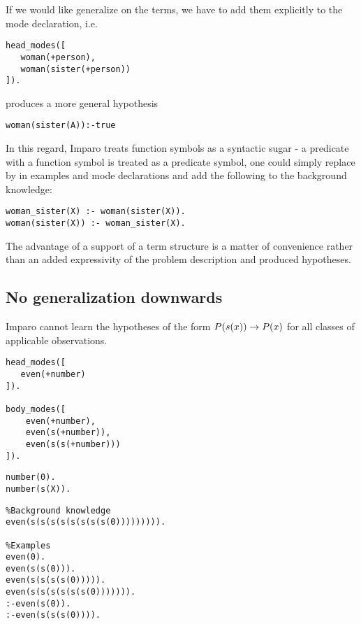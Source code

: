 If we would like generalize on the terms, we have to add them explicitly to the mode declaration, i.e.
\begin{lstlisting}
head_modes([
   woman(+person),
   woman(sister(+person))
]).
\end{lstlisting}
produces a more general hypothesis
\begin{lstlisting}
woman(sister(A)):-true
\end{lstlisting}

In this regard, Imparo treats function symbols as a syntactic sugar - a predicate with a function symbol is treated as a predicate symbol, one could simply replace  by  in examples and mode declarations and add the following to the background knowledge:
\begin{lstlisting}
woman_sister(X) :- woman(sister(X)).
woman(sister(X)) :- woman_sister(X).
\end{lstlisting}
The advantage of a support of a term structure is a matter of convenience rather than an added expressivity of the problem description and produced hypotheses.

\subsection{No generalization downwards}
Imparo cannot learn the hypotheses of the form $P(s(x)) \to P(x)$ for all classes of applicable observations.

\begin{minipage}[t]{.25\textwidth}
\begin{lstlisting}
head_modes([
   even(+number)
]).

body_modes([
    even(+number),
    even(s(+number)),
    even(s(s(+number)))
]).
\end{lstlisting}
\end{minipage}
\begin{minipage}[t]{.20\textwidth}
\begin{lstlisting}
number(0).
number(s(X)).

\end{lstlisting}
\end{minipage}
\begin{minipage}[t]{.25\textwidth}
\begin{lstlisting}
%Background knowledge
even(s(s(s(s(s(s(s(s(0))))))))).

%Examples
even(0).
even(s(s(0))).
even(s(s(s(s(0))))).
even(s(s(s(s(s(s(0))))))).
:-even(s(0)).
:-even(s(s(s(0)))).
\end{lstlisting}
\end{minipage}


